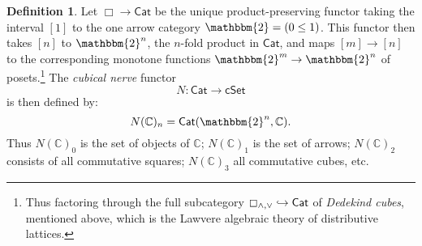 \documentclass[11pt,reqno]{amsart}
\newcommand{\bbtwo}{\ensuremath{\mathbbm{2}}}
\newcommand{\C}{\ensuremath{\boxempty}}
\newcommand{\bbC}{\ensuremath{\mathbb{C}}}
\newcommand{\Cat}{\ensuremath{\mathsf{Cat}}}
\newcommand{\cSet}{\ensuremath{\mathsf{cSet}}}
\newcommand{\hook}{\ensuremath{\hookrightarrow}}
\renewcommand{\to}{\ensuremath{\rightarrow}}
\theoremstyle{remark}
\theoremstyle{definition}
\newtheorem{definition}[theorem]{Definition}
\begin{document}
\begin{definition}
Let $\Box \to \Cat$ be the unique product-preserving functor taking the interval $[1]$ to the one arrow  category $\bbtwo = (0\leq1)$.  This functor then takes $[n]$ to $\bbtwo^n$, the $n$-fold product in $\Cat$, and maps $[m] \to [n]$ to the corresponding monotone functions $\bbtwo^m \to \bbtwo^n$ of posets.\footnote{Thus factoring through the full subcategory $\C_{\wedge,\vee} \hook\Cat$ of \emph{Dedekind cubes}, mentioned above, which is the Lawvere algebraic theory of distributive lattices.}   The  \emph{cubical nerve} functor 
\[
N : \Cat \to \cSet
\]
 is then defined by:
\[
N(\bbC)_n = \Cat(\bbtwo^n, \bbC).
\]
Thus $N(\bbC)_0$  is the set of objects of \bbC; $N(\bbC)_1$ is the set of arrows; $N(\bbC)_2$ consists of all commutative squares; $N(\bbC)_3$ all commutative cubes, etc. 
\end{definition}
\end{document}
